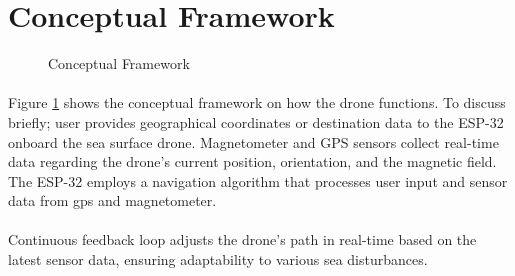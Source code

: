 \section{Conceptual Framework}
\begin{figure}[ht]
\begin{center}
\end{center}

\caption{Conceptual Framework}
\label{fig:ConceptualFramework}
\end{figure}

\paragraph{} Figure \ref{fig:ConceptualFramework} shows the conceptual framework on how the drone functions. To discuss briefly; user provides geographical
           coordinates or destination data to the ESP-32 onboard the sea surface drone. Magnetometer and GPS sensors collect real-time data regarding the 
           drone's current position, orientation, and the magnetic field. The ESP-32 employs a navigation algorithm that processes user input and sensor 
           data from gps and magnetometer.

\paragraph{} Continuous feedback loop adjusts the drone's path in real-time based on the latest sensor data, ensuring adaptability to various sea disturbances.

